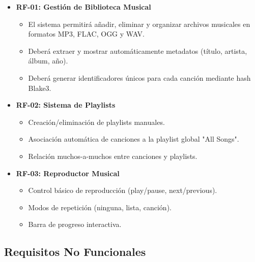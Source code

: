 \documentclass[11pt, a4paper]{article}
\begin{document}
  \begin{itemize}
  \item \textbf{RF-01: Gestión de Biblioteca Musical}
    \begin{itemize}
      \item El sistema permitirá añadir, eliminar y organizar archivos musicales en formatos MP3, FLAC, OGG y WAV.
      \item Deberá extraer y mostrar automáticamente metadatos (título, artista, álbum, año).
      \item Deberá generar identificadores únicos para cada canción mediante hash Blake3.
    \end{itemize}

  \item \textbf{RF-02: Sistema de Playlists}
    \begin{itemize}
      \item Creación/eliminación de playlists manuales.
      \item Asociación automática de canciones a la playlist global "All Songs".
      \item Relación muchos-a-muchos entre canciones y playlists.
    \end{itemize}

  \item \textbf{RF-03: Reproductor Musical}
    \begin{itemize}
      \item Control básico de reproducción (play/pause, next/previous).
      \item Modos de repetición (ninguna, lista, canción).
      \item Barra de progreso interactiva.
    \end{itemize}
  \end{itemize}

  \subsection{Requisitos No Funcionales}
\end{document}
